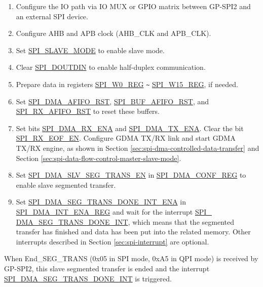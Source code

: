 \documentclass[main\_\_EN.tex]{subfiles}
\begin{document}
\begin{enumerate}
   \item  Configure the IO path via IO MUX or GPIO matrix between GP-SPI2 and an external SPI device.

   \item Configure AHB and APB clock (AHB\_CLK and APB\_CLK).

    \item Set \hyperref[fielddesc:SPISLAVEMODE]{SPI\_SLAVE\_MODE} to enable slave mode.

    \item Clear \hyperref[fielddesc:SPIDOUTDIN]{SPI\_DOUTDIN} to enable half-duplex communication.

    \item Prepare data in registers \hyperref[regdesc:SPIW0REG]{SPI\_W0\_REG} \verb+~+ \hyperref[regdesc:SPIW0REG]{SPI\_W15\_REG}, if needed.

    \item Set \hyperref[fielddesc:SPIDMAAFIFORST]{SPI\_DMA\_AFIFO\_RST}, \hyperref[fielddesc:SPIBUFAFIFORST]{SPI\_BUF\_AFIFO\_RST}, and \hyperref[fielddesc:SPIRXAFIFORST]{SPI\_RX\_AFIFO\_RST} to reset these buffers.

    \item Set bits \hyperref[fielddesc:SPIDMARXENA]{SPI\_DMA\_RX\_ENA} and \hyperref[fielddesc:SPIDMATXENA]{SPI\_DMA\_TX\_ENA}. Clear the bit \hyperref[fielddesc:SPIRXEOFEN]{SPI\_RX\_EOF\_EN}. Configure GDMA TX/RX link and start GDMA TX/RX engine, as shown in Section \ref{sec:spi-dma-controlled-data-transfer} and Section \ref{sec:spi-data-flow-control-master-slave-mode}.

    \item Set \hyperref[fielddesc:SPIDMASLVSEGTRANSEN]{SPI\_DMA\_SLV\_SEG\_TRANS\_EN} in \hyperref[regdesc:SPIDMACONFREG]{SPI\_DMA\_CONF\_REG} to enable slave segmented transfer.

    \item Set \hyperref[fielddesc:SPIDMASEGTRANSDONEINTENA]{SPI\_DMA\_SEG\_TRANS\_DONE\_INT\_ENA} in \hyperref[regdesc:SPIDMAINTENAREG]{SPI\_DMA\_INT\_ENA\_REG} and wait for the interrupt \hyperref[int:SPIDMASEGTRANSDONEINT]{SPI\_\\DMA\_SEG\_TRANS\_DONE\_INT}, which means that the segmented transfer has finished and data has been put into the related memory. Other interrupts described in Section \ref{sec:spi-interrupt} are optional.
\end{enumerate}

When End\_SEG\_TRANS (0x05 in SPI mode, 0xA5 in QPI mode) is received by GP-SPI2, this slave segmented transfer is ended and the interrupt \hyperref[int:SPIDMASEGTRANSDONEINT]{SPI\_DMA\_SEG\_TRANS\_DONE\_INT} is triggered.
\end{document}
